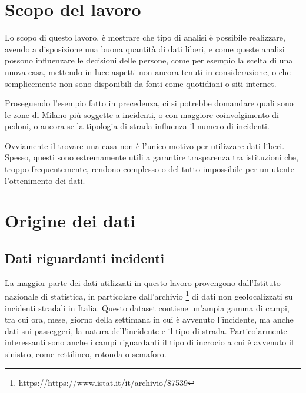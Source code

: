 \documentclass[a4paper]{report}
\begin{document}

\section{Scopo del lavoro}

Lo scopo di questo lavoro, è mostrare che tipo di analisi è possibile realizzare, 
avendo a disposizione 
una buona quantità di dati liberi, e come queste analisi possono influenzare le decisioni delle 
persone, come per esempio la scelta di una nuova casa, mettendo in luce aspetti non ancora 
tenuti in considerazione, o che semplicemente non sono disponibili da fonti 
come quotidiani o siti internet.

Proseguendo l'esempio fatto in precedenza, ci si potrebbe domandare quali sono le zone di Milano 
più soggette a incidenti, o con maggiore coinvolgimento di pedoni, o ancora se la tipologia di strada 
influenza il numero di incidenti.

Ovviamente il trovare una casa non è l'unico motivo per utilizzare dati liberi. 
Spesso, questi sono estremamente utili a garantire trasparenza tra istituzioni che, troppo frequentemente, 
rendono complesso o del tutto impossibile per un utente l'ottenimento dei dati.


\section{Origine dei dati}

\subsection{Dati riguardanti incidenti}
La maggior parte dei dati utilizzati in questo lavoro provengono 
dall'Istituto nazionale di statistica, in particolare dall'archivio
\footnote{\url{https://https://www.istat.it/it/archivio/87539}}
di dati non geolocalizzati su incidenti stradali in Italia.
Questo dataset contiene un'ampia gamma di campi, tra cui ora, 
mese, giorno della settimana in cui è avvenuto l'incidente, 
ma anche dati sui passeggeri, la natura dell'incidente e il tipo di strada. 
Particolarmente interessanti sono anche i campi riguardanti il tipo di incrocio a cui è 
avvenuto il sinistro, come rettilineo, rotonda o semaforo.
\end{document}
